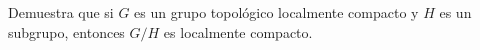 \item Demuestra que si $G$ es un grupo topológico localmente compacto y $H$ es un subgrupo, entonces $G / H$ es localmente compacto.